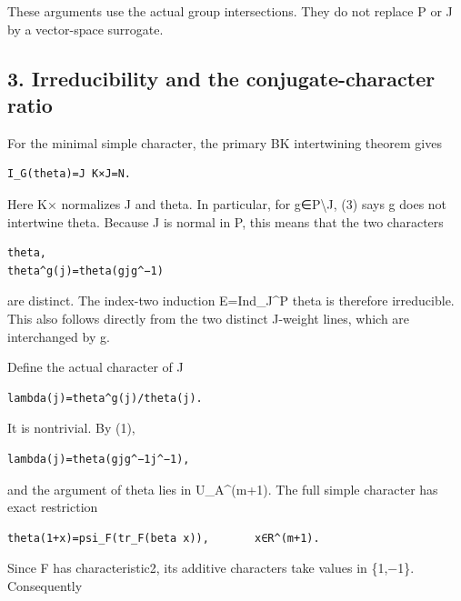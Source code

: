 These arguments use the actual group intersections. They do not replace
P or J by a vector-space surrogate.

\hypertarget{rank2-irreducibility-and-the-conjugate-character-ratio}{%
\subsection{3. Irreducibility and the conjugate-character
ratio}\label{rank2-irreducibility-and-the-conjugate-character-ratio}}

For the minimal simple character, the primary BK intertwining theorem
gives

\begin{Verbatim}[fontsize=\small,breaklines=true,breakanywhere=true]
I_G(theta)=J K×J=N.
\end{Verbatim}

Here K× normalizes J and theta. In particular, for g∈P\textbackslash J,
(3) says g does not intertwine theta. Because J is normal in P, this
means that the two characters

\begin{Verbatim}[fontsize=\small,breaklines=true,breakanywhere=true]
theta,
theta^g(j)=theta(gjg^−1)
\end{Verbatim}

are distinct. The index-two induction E=Ind\_J\^{}P theta is therefore
irreducible. This also follows directly from the two distinct J-weight
lines, which are interchanged by g.

Define the actual character of J

\begin{Verbatim}[fontsize=\small,breaklines=true,breakanywhere=true]
lambda(j)=theta^g(j)/theta(j).
\end{Verbatim}

It is nontrivial. By (1),

\begin{Verbatim}[fontsize=\small,breaklines=true,breakanywhere=true]
lambda(j)=theta(gjg^−1j^−1),
\end{Verbatim}

and the argument of theta lies in U\_A\^{}(m+1). The full simple
character has exact restriction

\begin{Verbatim}[fontsize=\small,breaklines=true,breakanywhere=true]
theta(1+x)=psi_F(tr_F(beta x)),       x∈R^(m+1).
\end{Verbatim}

Since F has characteristic2, its additive characters take values in
\{1,−1\}. Consequently

